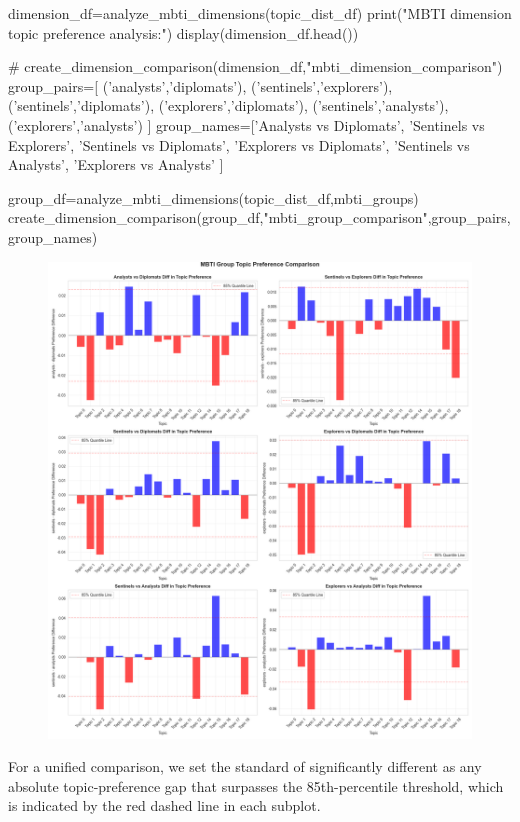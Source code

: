 \documentclass[12pt]{article}
\begin{document}
\begin{python}
dimension_df=analyze_mbti_dimensions(topic_dist_df)
print("MBTI dimension topic preference analysis:")
display(dimension_df.head())

# create_dimension_comparison(dimension_df,"mbti_dimension_comparison")
group_pairs=[
            ('analysts','diplomats'),
            ('sentinels','explorers'),
            ('sentinels','diplomats'),
            ('explorers','diplomats'),
            ('sentinels','analysts'),
            ('explorers','analysts')
             ]
group_names=['Analysts vs Diplomats',
             'Sentinels vs Explorers',
             'Sentinels vs Diplomats',
             'Explorers vs Diplomats',
             'Sentinels vs Analysts',
             'Explorers vs Analysts'
             ]

group_df=analyze_mbti_dimensions(topic_dist_df,mbti_groups)
create_dimension_comparison(group_df,"mbti_group_comparison",group_pairs,group_names)
	\end{python}
	\begin{figure}[H]
			\centering
			\includegraphics[width=1\textwidth]{Q2grouppre} 	
	\end{figure}
	
	For a unified comparison, we set the standard of significantly different as any absolute topic-preference gap that surpasses the 85th-percentile threshold, which is indicated by the red dashed line in each subplot.
	
\end{document}
